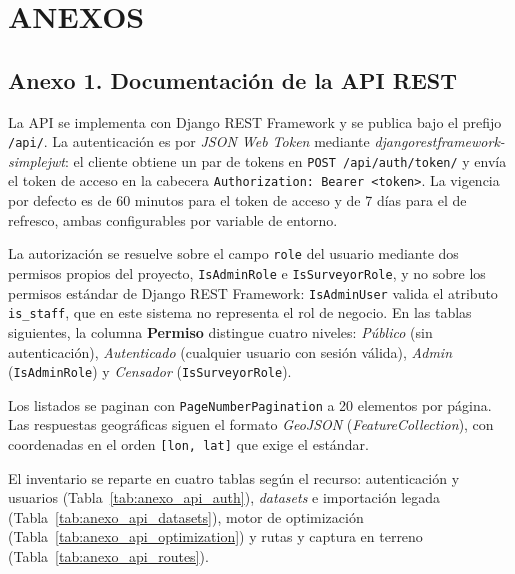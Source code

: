 \chapter*{ANEXOS}

\captionsetup{list=false}

\section*{Anexo 1. Documentación de la API REST}

La API se implementa con Django REST Framework y se publica bajo el prefijo
\texttt{/api/}. La autenticación es por \textit{JSON Web Token} mediante
\textit{djangorestframework-simplejwt}: el cliente obtiene un par de tokens en
\texttt{POST /api/auth/token/} y envía el token de acceso en la cabecera
\texttt{Authorization: Bearer <token>}. La vigencia por defecto es de 60 minutos
para el token de acceso y de 7 días para el de refresco, ambas configurables por
variable de entorno.

La autorización se resuelve sobre el campo \texttt{role} del usuario mediante dos
permisos propios del proyecto, \texttt{IsAdminRole} e \texttt{IsSurveyorRole}, y no
sobre los permisos estándar de Django REST Framework: \texttt{IsAdminUser} valida el
atributo \texttt{is\_staff}, que en este sistema no representa el rol de negocio. En
las tablas siguientes, la columna \textbf{Permiso} distingue cuatro niveles:
\textit{Público} (sin autenticación), \textit{Autenticado} (cualquier usuario con
sesión válida), \textit{Admin} (\texttt{IsAdminRole}) y \textit{Censador}
(\texttt{IsSurveyorRole}).

Los listados se paginan con \texttt{PageNumberPagination} a 20 elementos por página.
Las respuestas geográficas siguen el formato \textit{GeoJSON}
(\textit{FeatureCollection}), con coordenadas en el orden \texttt{[lon, lat]} que
exige el estándar.

El inventario se reparte en cuatro tablas según el recurso:
autenticación y usuarios (Tabla~\ref{tab:anexo_api_auth}), \textit{datasets} e
importación legada (Tabla~\ref{tab:anexo_api_datasets}), motor de optimización
(Tabla~\ref{tab:anexo_api_optimization}) y rutas y captura en terreno
(Tabla~\ref{tab:anexo_api_routes}).

